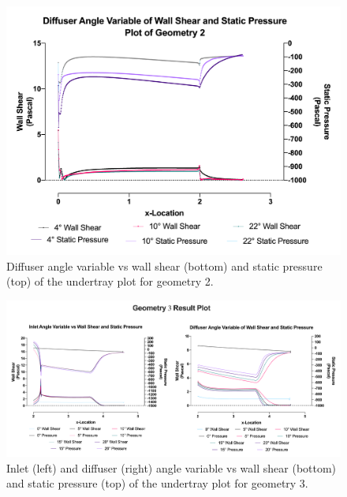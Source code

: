 \begin{figure}[]
    \centering
    \includegraphics[scale=0.82]{Figures/2D_OF/2D_OF_A2_PRESS_WShear_PLOT.png}
    \caption{Diffuser angle variable vs wall shear (bottom) and static pressure (top) of the undertray plot for geometry 2.}
    \label{fig:2D_OF_A2_PLOT}
\end{figure}

\begin{figure}[]
    \centering
    \includegraphics[scale=0.82]{Figures/2D_OF/2D_OF_A3_PRESS_WShear_PLOT.png}
    \caption{Inlet (left) and diffuser (right) angle variable vs wall shear (bottom) and static pressure (top) of the undertray plot for geometry 3.}
    \label{fig:2D_OF_A3_PLOT}
\end{figure}



